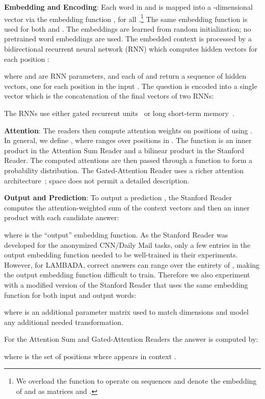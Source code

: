 \documentclass[11pt]{article}
\newenvironment{enumeratesquish}{\begin{list}{\addtocounter{enumi}{1}\labelenumi}{\setlength{\itemsep}{0em}\setlength{\labelwidth}{0.5em}\setlength{\leftmargin}{\labelwidth}\addtolength{\leftmargin}{\labelsep}}}{\end{list}\setcounter{enumi}{0}}
\begin{document}
\begin{enumeratesquish}

\item \textbf{Embedding and Encoding}\label{embedding}: Each word in  and  is mapped into a -dimensional vector via the embedding function , for all .\footnote{We overload the  function to operate on sequences and denote the embedding of  and  as matrices  and .} 
The same embedding function is used for both  and . The embeddings are learned from random initialization; no pretrained word embeddings are used. 
The embedded context is processed by a bidirectional recurrent neural network (RNN) which computes hidden vectors  for each position : 

\noindent where  and  are RNN parameters, and each of  and  return a sequence of hidden vectors, one for each position in the input . 
The question is encoded into a single vector  which is the concatenation of the final vectors of two RNNs:

\noindent The RNNs use either gated recurrent units~\cite{cho-gru:14} or long short-term memory~\cite{lstm:97}. 

\item \textbf{Attention}: The readers then compute attention weights on positions of  using . 
In general, we define 
, 
where  ranges over positions in . 
The  function is an inner product in the Attention Sum Reader and a bilinear product in the Stanford Reader. 
The computed attentions are then passed through a  function to form a probability distribution. 
The Gated-Attention Reader uses a richer attention architecture~\cite{gated-as-reader:16}; space does not permit a detailed description. 

\item \textbf{Output and Prediction}: To output a prediction , 
the Stanford Reader computes the attention-weighted sum of the context vectors and then an inner product with each candidate answer: 

\noindent where  is the ``output'' embedding function. 
As the Stanford Reader was developed for the anonymized CNN/Daily Mail tasks, only a few entries in the output embedding function needed to be well-trained in their experiments. However, for LAMBADA, correct answers can range over the entirety of , making the output embedding function difficult to train. Therefore we also experiment with a modified version of the Stanford Reader that uses the same embedding function  for both input and output words:

where  is an additional parameter matrix used to match  dimensions and model any additional needed transformation.  

For the Attention Sum and Gated-Attention Readers the answer is computed by: 

where  is the set of positions where  appears in context . 
\end{enumeratesquish}
\end{document}
